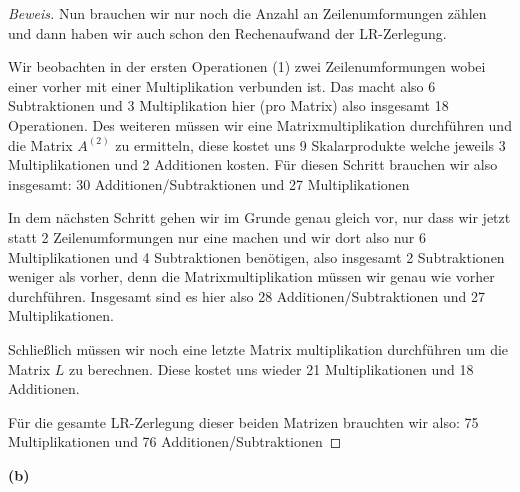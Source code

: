 \documentclass[10pt]{article}
\begin{document}
\begin{proof}[Beweis]
	Nun brauchen wir nur noch die Anzahl an Zeilenumformungen zählen und dann haben wir auch schon den Rechenaufwand der LR-Zerlegung.

	Wir beobachten in der ersten Operationen (1) zwei Zeilenumformungen wobei einer
	vorher mit einer Multiplikation verbunden ist. Das macht also 6 Subtraktionen und
	3 Multiplikation hier (pro Matrix) also insgesamt 18 Operationen.
	Des weiteren müssen wir eine Matrixmultiplikation durchführen
	und die Matrix $A^{(2)}$ zu ermitteln, diese kostet uns 9 Skalarprodukte welche
	jeweils 3 Multiplikationen und 2 Additionen kosten. Für diesen Schritt brauchen wir also
	insgesamt: 30 Additionen/Subtraktionen und 27 Multiplikationen

	In dem nächsten Schritt gehen wir im Grunde genau gleich vor, nur dass wir jetzt statt
	2 Zeilenumformungen nur eine machen und wir dort also nur 6 Multiplikationen und
	4 Subtraktionen benötigen, also insgesamt 2 Subtraktionen weniger als vorher, denn
	die Matrixmultiplikation müssen wir genau wie vorher durchführen.
	Insgesamt sind es hier also 28 Additionen/Subtraktionen und 27 Multiplikationen.

	Schließlich müssen wir noch eine letzte Matrix multiplikation durchführen um die Matrix
	$L$ zu berechnen. Diese kostet uns wieder 21 Multiplikationen und 18 Additionen.

	Für die gesamte LR-Zerlegung dieser beiden Matrizen brauchten wir also:
	75 Multiplikationen und 76 Additionen/Subtraktionen


\end{proof}

\textbf{(b)}
\end{document}
